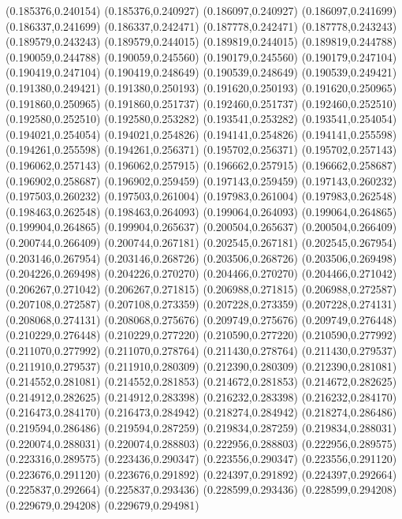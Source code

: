 (0.185376,0.240154)
(0.185376,0.240927)
(0.186097,0.240927)
(0.186097,0.241699)
(0.186337,0.241699)
(0.186337,0.242471)
(0.187778,0.242471)
(0.187778,0.243243)
(0.189579,0.243243)
(0.189579,0.244015)
(0.189819,0.244015)
(0.189819,0.244788)
(0.190059,0.244788)
(0.190059,0.245560)
(0.190179,0.245560)
(0.190179,0.247104)
(0.190419,0.247104)
(0.190419,0.248649)
(0.190539,0.248649)
(0.190539,0.249421)
(0.191380,0.249421)
(0.191380,0.250193)
(0.191620,0.250193)
(0.191620,0.250965)
(0.191860,0.250965)
(0.191860,0.251737)
(0.192460,0.251737)
(0.192460,0.252510)
(0.192580,0.252510)
(0.192580,0.253282)
(0.193541,0.253282)
(0.193541,0.254054)
(0.194021,0.254054)
(0.194021,0.254826)
(0.194141,0.254826)
(0.194141,0.255598)
(0.194261,0.255598)
(0.194261,0.256371)
(0.195702,0.256371)
(0.195702,0.257143)
(0.196062,0.257143)
(0.196062,0.257915)
(0.196662,0.257915)
(0.196662,0.258687)
(0.196902,0.258687)
(0.196902,0.259459)
(0.197143,0.259459)
(0.197143,0.260232)
(0.197503,0.260232)
(0.197503,0.261004)
(0.197983,0.261004)
(0.197983,0.262548)
(0.198463,0.262548)
(0.198463,0.264093)
(0.199064,0.264093)
(0.199064,0.264865)
(0.199904,0.264865)
(0.199904,0.265637)
(0.200504,0.265637)
(0.200504,0.266409)
(0.200744,0.266409)
(0.200744,0.267181)
(0.202545,0.267181)
(0.202545,0.267954)
(0.203146,0.267954)
(0.203146,0.268726)
(0.203506,0.268726)
(0.203506,0.269498)
(0.204226,0.269498)
(0.204226,0.270270)
(0.204466,0.270270)
(0.204466,0.271042)
(0.206267,0.271042)
(0.206267,0.271815)
(0.206988,0.271815)
(0.206988,0.272587)
(0.207108,0.272587)
(0.207108,0.273359)
(0.207228,0.273359)
(0.207228,0.274131)
(0.208068,0.274131)
(0.208068,0.275676)
(0.209749,0.275676)
(0.209749,0.276448)
(0.210229,0.276448)
(0.210229,0.277220)
(0.210590,0.277220)
(0.210590,0.277992)
(0.211070,0.277992)
(0.211070,0.278764)
(0.211430,0.278764)
(0.211430,0.279537)
(0.211910,0.279537)
(0.211910,0.280309)
(0.212390,0.280309)
(0.212390,0.281081)
(0.214552,0.281081)
(0.214552,0.281853)
(0.214672,0.281853)
(0.214672,0.282625)
(0.214912,0.282625)
(0.214912,0.283398)
(0.216232,0.283398)
(0.216232,0.284170)
(0.216473,0.284170)
(0.216473,0.284942)
(0.218274,0.284942)
(0.218274,0.286486)
(0.219594,0.286486)
(0.219594,0.287259)
(0.219834,0.287259)
(0.219834,0.288031)
(0.220074,0.288031)
(0.220074,0.288803)
(0.222956,0.288803)
(0.222956,0.289575)
(0.223316,0.289575)
(0.223436,0.290347)
(0.223556,0.290347)
(0.223556,0.291120)
(0.223676,0.291120)
(0.223676,0.291892)
(0.224397,0.291892)
(0.224397,0.292664)
(0.225837,0.292664)
(0.225837,0.293436)
(0.228599,0.293436)
(0.228599,0.294208)
(0.229679,0.294208)
(0.229679,0.294981)
